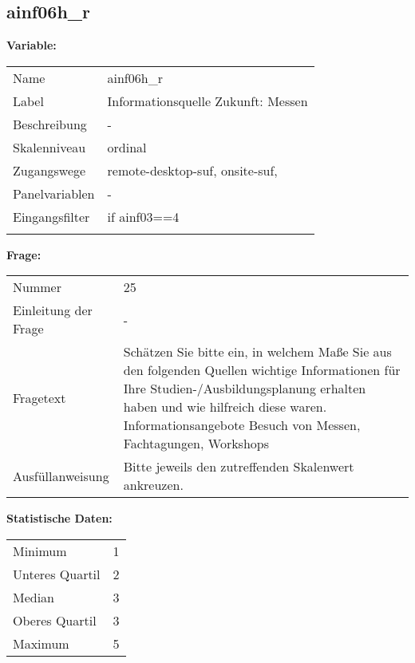 	
	
	\subsection{ainf06h\_r}
	\label{subSection:ainf06h_r}

	\noindent\textbf{Variable:}\\
		\begin{tabular}{lL{11.3cm}}
			\label{tableVariable:ainf06h_r}
			Name & ainf06h\_r \\
			Label & Informationsquelle Zukunft: Messen \\
			Beschreibung & - \\
			Skalenniveau & ordinal \\
			Zugangswege &
				remote-desktop-suf,
				onsite-suf,
 \\
			Panelvariablen & -
			 \\
			Eingangsfilter & if ainf03==4 \\
 \\
		\end{tabular}

		\vspace*{1 cm}
		\noindent\textbf{Frage:}\\
		\begin{tabular}{lL{11.3cm}}
			\label{tableQuestion:ainf06h_r}
			Nummer & 25 \\
			Einleitung der Frage & - \\
			Fragetext & Schätzen Sie bitte ein, in welchem Maße Sie aus den folgenden Quellen wichtige Informationen für Ihre Studien-/Ausbildungsplanung erhalten haben und wie hilfreich diese waren.
Informationsangebote
Besuch von Messen, Fachtagungen, Workshops \\
			Ausfüllanweisung & Bitte jeweils den zutreffenden Skalenwert ankreuzen. \\
		\end{tabular}


		\vspace*{1 cm}
		\noindent\textbf{Statistische Daten:}\\
			\begin{tabular}{ll}
				\label{tableStatistics:ainf06h_r}
					Minimum & 1 \\
					Unteres Quartil & 2 \\
					Median & 3 \\
					Oberes Quartil & 3 \\
					Maximum & 5 \\
			\end{tabular}



